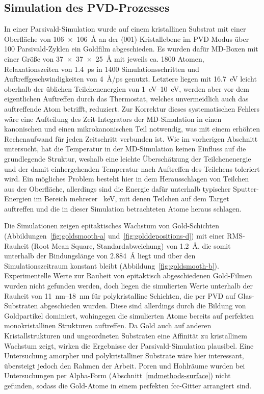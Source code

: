 \subsection{Simulation des PVD-Prozesses}

In einer Parsivald-Simulation wurde auf einem kristallinen Substrat mit einer Oberfläche von \SI{106x106}{\angstrom} an der (001)-Kristallebene im PVD-Modus über 100 Parsivald-Zyklen ein Goldfilm abgeschieden.
Es wurden dafür MD-Boxen mit einer Größe von \SI{37x37x25}{\angstrom} mit jeweils ca. \num{1800} Atomen, Relaxationszeiten von \SI{1.4}{\pico\second} in \num{1400} Simulationsschritten und Auftreffgeschwindigkeiten von \SI{4}{\angstrom/\pico\second} genutzt.
Letztere liegen mit \SI{16.7}{\electronvolt} leicht oberhalb der üblichen Teilchenenergien von \SIrange{1}{10}{\electronvolt}\cite{thompson_ii._1968}, werden aber vor dem eigentlichen Auftreffen durch das Thermostat, welches unvermeidlich auch das auftreffende Atom betrifft, reduziert.
Zur Korrektur dieses systematischen Fehlers wäre eine Aufteilung des Zeit-Integrators der MD-Simulation in einen kanonischen und einen mikrokanonischen Teil notwendig, was mit einem erhöhten Rechenaufwand für jeden Zeitschritt verbunden ist.
Wie im vorherigen Abschnitt untersucht, hat die Temperatur in der MD-Simulation keinen Einfluss auf die grundlegende Struktur, weshalb eine leichte Überschätzung der Teilchenenergie und der damit einhergehenden Temperatur nach Auftreffen des Teilchens toleriert wird.
Ein mögliches Problem besteht hier in dem Herausschlagen von Teilchen aus der Oberfläche, allerdings sind die Energie dafür unterhalb typischer Sputter-Energien im Bereich mehrerer \SI{}{\kilo\electronvolt}\cite{mattox_handbook_2010}, mit denen Teilchen auf dem Target auftreffen und die in dieser Simulation betrachteten Atome heraus schlagen.

Die Simulationen zeigen epitaktisches Wachstum von Gold-Schichten (Abbildungen~\ref{fig:goldsmooth-a} und~\ref{fig:golddepositions-d}) mit einer RMS-Rauheit (Root Mean Square, Standardabweichung) von \SI{1.2}{\angstrom}, die somit unterhalb der Bindungslänge von \SI{2.884}{\angstrom} liegt und über den Simulationszeitraum konstant bleibt (Abbildung~\ref{fig:goldsmooth-b}).
Experimentelle Werte zur Rauheit von epitaktisch abgeschiedenen Gold-Filmen wurden nicht gefunden werden, doch liegen die simulierten Werte unterhalb der Rauheit von \SIrange{11}{18}{\nano\meter} für polykristalline Schichten, die per PVD auf Glas-Substraten abgeschieden wurden\cite{svorcik_annealing_2011}.
Diese sind allerdings durch die Bildung von Goldpartikel dominiert, wohingegen die simulierten Atome bereits auf perfekten monokristallinen Strukturen auftreffen.
Da Gold auch auf anderen Kristallstrukturen und ungeordneten Substraten eine Affinität zu kristallinem Wachstum zeigt\cite{gottsche_uber_1956,everitt_evolution_2000}, wirken die Ergebnisse der Parsivald-Simulation plausibel.
Eine Untersuchung amorpher und polykristalliner Substrate wäre hier interessant, übersteigt jedoch den Rahmen der Arbeit.
Poren und Hohlräume wurden bei Untersuchungen per Alpha-Form (Abschnitt~\ref{mdmethods-surface}) nicht gefunden, sodass die Gold-Atome in einem perfekten fcc-Gitter arrangiert sind.

